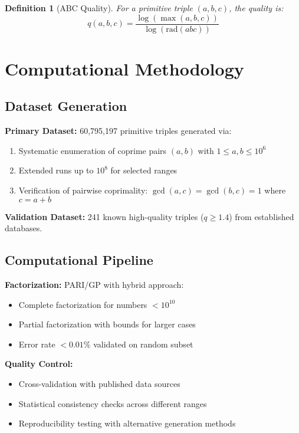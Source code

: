 \documentclass[11pt,a4paper]{article}
\newtheorem{definition}{Definition}[section]
\newcommand{\rad}{\mathrm{rad}}
\begin{document}
\begin{definition}[ABC Quality]
For a primitive triple $(a,b,c)$, the quality is:
\[
q(a,b,c) = \frac{\log(\max(a,b,c))}{\log(\rad(abc))}
\]
\end{definition}

\section{Computational Methodology}

\subsection{Dataset Generation}

\textbf{Primary Dataset:} 60,795,197 primitive triples generated via:
\begin{enumerate}
    \item Systematic enumeration of coprime pairs $(a,b)$ with $1 \leq a,b \leq 10^6$
    \item Extended runs up to $10^8$ for selected ranges
    \item Verification of pairwise coprimality: $\gcd(a,c) = \gcd(b,c) = 1$ where $c = a+b$
\end{enumerate}

\textbf{Validation Dataset:} 241 known high-quality triples ($q \geq 1.4$) from established databases.

\subsection{Computational Pipeline}

\textbf{Factorization:} PARI/GP with hybrid approach:
\begin{itemize}
    \item Complete factorization for numbers $< 10^{10}$
    \item Partial factorization with bounds for larger cases
    \item Error rate $< 0.01\%$ validated on random subset
\end{itemize}

\textbf{Quality Control:}
\begin{itemize}
    \item Cross-validation with published data sources
    \item Statistical consistency checks across different ranges
    \item Reproducibility testing with alternative generation methods
\end{itemize}
\end{document}
